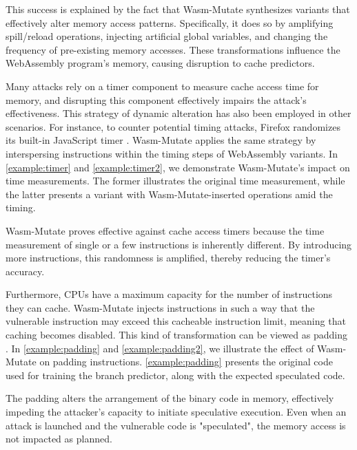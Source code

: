 \documentclass[a4paper,fleqn]{cas-dc}
\newcommand{\tool}{{\sc Wasm-Mutate}\xspace}
\newcommand{\Wasm}{WebAssembly\xspace}
\newcommand{\wasm}{\Wasm}
\begin{document}
This success is explained by the fact that \tool synthesizes variants that effectively alter memory access patterns. 
Specifically, it does so by amplifying spill/reload operations, injecting artificial global variables, and changing the frequency of pre-existing memory accesses. 
These transformations influence the \wasm program's memory, causing disruption to cache predictors. 

Many attacks rely on a timer component to measure cache access time for memory, and disrupting this component  effectively impairs the attack's effectiveness. 
This strategy of dynamic alteration has also been  employed in other scenarios. 
For instance, to counter potential timing attacks, Firefox randomizes its built-in JavaScript timer \cite{10.1007/978-3-319-70972-7_13}. \tool applies the same strategy by interspersing instructions within the timing steps of \wasm variants. 
In \autoref{example:timer} and \autoref{example:timer2}, we demonstrate \tool's impact on time measurements. 
The former illustrates the original time measurement, while the latter presents a variant with \tool-inserted operations amid the timing.



\tool proves effective against cache access timers because the time measurement of single or a few instructions is inherently different. 
By introducing more instructions, this randomness is amplified, thereby reducing the timer's accuracy.


Furthermore, CPUs have a maximum capacity for the number of instructions they can cache.
\tool injects instructions in such a way that the vulnerable instruction may exceed this cacheable instruction limit, meaning that caching becomes disabled.
This kind of transformation can be viewed as padding \cite{padding}.
In \autoref{example:padding} and \autoref{example:padding2}, we illustrate the effect of \tool on padding instructions.
\autoref{example:padding} presents the original code used for training the branch predictor, along with the expected speculated code.



The padding alters the arrangement of the binary code in memory, effectively impeding the attacker's capacity to initiate speculative execution.
Even when an attack is launched and the vulnerable code is "speculated", the memory access is not impacted as planned.
\end{document}
